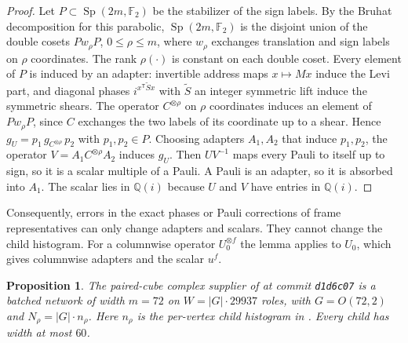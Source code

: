 \documentclass[11pt]{article}
\newtheorem{proposition}[theorem]{Proposition}
\theoremstyle{definition}
\newcommand{\F}{\mathbb F}
\begin{document}
\begin{proof}
Let $P\subset\operatorname{Sp}(2m,\F_2)$ be the stabilizer of the sign labels.
By the Bruhat decomposition for this parabolic, $\operatorname{Sp}(2m,\F_2)$ is
the disjoint union of the double cosets $Pw_\rho P$, $0\le\rho\le m$, where
$w_\rho$ exchanges translation and sign labels on $\rho$ coordinates. The rank
$\rho(\cdot)$ is constant on each double coset. Every element of $P$ is induced
by an adapter: invertible address maps $x\mapsto Mx$ induce the Levi part, and
diagonal phases $i^{x^{\mathsf T}\tilde Sx}$ with $\tilde S$ an integer
symmetric lift induce the symmetric shears. The operator $C^{\otimes\rho}$ on
$\rho$ coordinates induces an element of $Pw_\rho P$, since $C$ exchanges the
two labels of its coordinate up to a shear. Hence $g_U=p_1\,g_{C^{\otimes\rho}}\,p_2$
with $p_1,p_2\in P$. Choosing adapters $A_1,A_2$ that induce $p_1,p_2$, the
operator $V=A_1C^{\otimes\rho}A_2$ induces $g_U$. Then $UV^{-1}$ maps every Pauli
to itself up to sign, so it is a scalar multiple of a Pauli. A Pauli is an
adapter, so it is absorbed into $A_1$. The scalar lies in $\mathbb Q(i)$
because $U$ and $V$ have entries in $\mathbb Q(i)$.
\end{proof}

Consequently, errors in the exact phases or Pauli corrections of frame
representatives can only change adapters and scalars. They cannot change the
child histogram. For a columnwise operator $U_0^{\otimes f}$ the lemma applies
to $U_0$, which gives columnwise adapters and the scalar $u^f$.

\begin{proposition}\label{prop:network}
The paired-cube complex supplier of \cite{cms} at commit \texttt{d1d6c07} is a
batched network of width $m=72$ on $W=|G|\cdot29937$ roles, with $G=O(72,2)$
and $N_\rho=|G|\cdot n_\rho$. Here $n_\rho$ is the per-vertex child histogram in
. Every child has width at most $60$.
\end{proposition}
\end{document}
